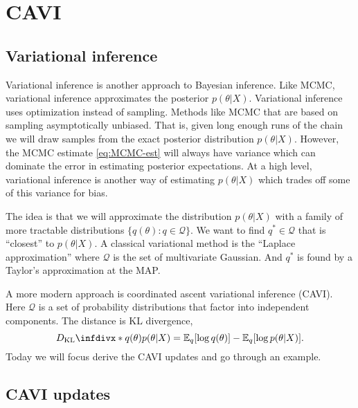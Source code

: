 \section{CAVI}\label{sec cavi}

\subsection{Variational inference}

Variational inference is another approach to Bayesian inference. Like MCMC, variational inference approximates the posterior $p(\theta|X)$. Variational inference uses optimization instead of sampling. Methods like MCMC that are based on sampling asymptotically unbiased. That is, given long enough runs of the chain we will draw samples from the exact posterior distribution $p(\theta | X)$. However, the MCMC estimate \eqref{eq:MCMC-est} will always have variance which can dominate the error in estimating posterior expectations. At a high level, variational inference is another way of estimating $p(\theta | X)$ which trades off some of this variance for bias. 

The idea is that we will approximate the distribution $p(\theta| X)$ with a family of more tractable distributions $\{q(\theta) : q \in \mathcal{Q}\}$. We want to find $q^* \in \mathcal{Q}$ that is ``closest'' to $p(\theta |  X)$. A classical variational method is the ``Laplace approximation'' where $\mathcal{Q}$ is the set of multivariate Gaussian. And $q^*$ is found by a Taylor's approximation at the MAP. 

A more modern approach is coordinated ascent variational inference (CAVI). Here $\mathcal{Q}$ is a set of probability distributions that factor into independent components. The distance is KL divergence, 
\[\KLD{q(\theta)}{p(\theta | X)} = \bbE_q[\log q(\theta) ] - \bbE_q[\log p(\theta | X)].\]
Today we will focus derive the CAVI updates and go through an example.

\subsection{CAVI updates}


